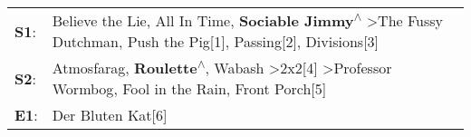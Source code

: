 \begin{supertabular}{p{0.03\textwidth}p{0.92\textwidth}}
 \textbf{S1}:  &  Believe the Lie\textsuperscript{}, \enspace All In Time\textsuperscript{}, \enspace \textbf{Sociable Jimmy\textsuperscript{$\wedge$}} \textgreater \enspace The Fussy Dutchman\textsuperscript{}, \enspace Push the Pig[1]\textsuperscript{}, \enspace Passing[2]\textsuperscript{}, \enspace Divisions[3]\textsuperscript{}  \enspace  \\
 \textbf{S2}:  &        Atmosfarag\textsuperscript{}, \enspace \textbf{Roulette\textsuperscript{$\wedge$}}, \enspace Wabash\textsuperscript{} \textgreater \enspace 2x2[4]\textsuperscript{} \textgreater \enspace Professor Wormbog\textsuperscript{}, \enspace Fool in the Rain\textsuperscript{}, \enspace Front Porch[5]\textsuperscript{}  \enspace  \\
 \textbf{E1}:  &                                                                                                                                                                                                                                                                                           Der Bluten Kat[6]\textsuperscript{}  \enspace  \\
\end{supertabular}
